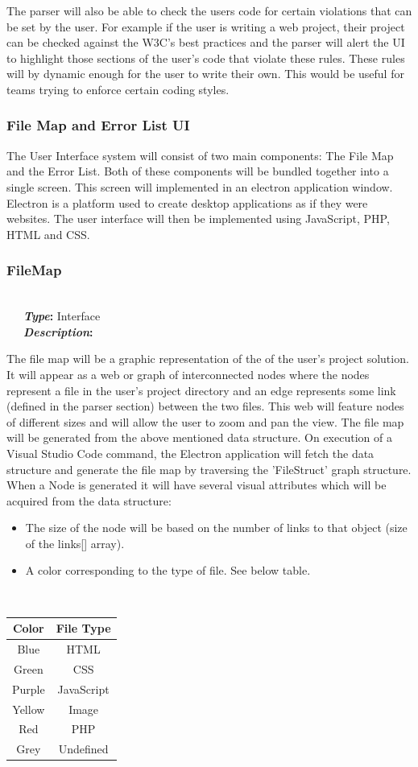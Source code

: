 \documentclass[letterpaper,10pt,titlepage,draftclsnofoot,onecolumn,onesided] {IEEEtran}
\newcommand{\bolditin}[2]{
	\-\ \-\ \-\ \textbf{\textit{#1}#2}
}
\begin{document}
The parser will also be able to check the users code for certain violations that can be set by the user.
For example if the user is writing a web project, their project can be checked against the W3C's best practices and the parser will alert the UI to highlight those sections of the user's code that violate these rules.
These rules will by dynamic enough for the user to write their own.
This would be useful for teams trying to enforce certain coding styles.\cite{w3c}
	
\subsubsection{File Map and Error List UI}
The User Interface system will consist of two main components: The File Map and the Error List. 	
Both of these components will be bundled together into a single screen. 
This screen will implemented in an electron application window. 
Electron is a platform used to create desktop applications as if they were websites. \cite{Electron}
The user interface will then be implemented using JavaScript, PHP, HTML and CSS.
	
\subsubsection{FileMap}
\hfill \\
\bolditin{Type}{:} Interface \\
\bolditin{Description}{:} 
The file map will be a graphic representation of the of the user's project solution. 
It will appear as a web or graph of interconnected nodes where the nodes represent a file in the user's project directory and an edge represents some link (defined in the parser section) between the two files. 
This web will feature nodes of different sizes and will allow the user to zoom and pan the view.
The file map will be generated from the above mentioned data structure. 
On execution of a Visual Studio Code command, the Electron application will fetch the data structure and generate the file map by traversing the 'FileStruct' graph structure.
When a Node is generated it will have several visual attributes which will be acquired from the data structure:
\begin{itemize}
	\item The size of the node will be based on the number of links to that object (size of the links[] array). 
	\item A color corresponding to the type of file. See below table.
\end{itemize}
\hfill \\
\begin{tabular}{| c | c |}
	\hline
	Color & File Type\\
	\hline
	Blue & HTML\\
	Green & CSS\\
	Purple & JavaScript\\
	Yellow & Image\\
	Red & PHP\\
	Grey & Undefined\\
	\hline
\end{tabular}
	
\end{document}

